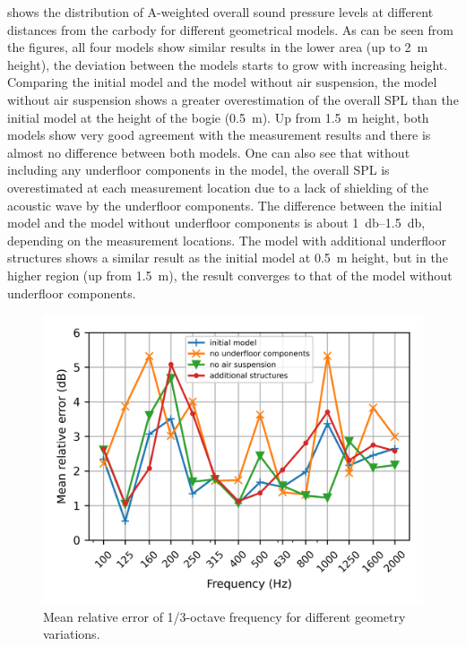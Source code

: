 shows the distribution of  A-weighted overall sound pressure levels at different distances from the carbody for different geometrical models.
As can be seen from the figures, all four models show similar results in the lower area (up to \SI{2}{\meter} height), the deviation between the models starts to grow with increasing height. Comparing the initial model and the model without air suspension, the model without air suspension shows a greater overestimation of the overall SPL than the initial model at the height of the bogie (\SI{0.5}{\meter}). Up from \SI{1.5}{\meter} height, both models show very good agreement with the measurement results and there is almost no difference between both models. One can also see that without including any underfloor components in the model, the overall SPL is overestimated at each measurement location due to a lack of shielding of the acoustic wave by the underfloor components. The difference between the initial model and the model without underfloor components is about \SIrange{1}{1.5}{\decibel}, depending on the measurement locations. The model with additional underfloor structures shows a similar result as the initial model at \SI{0.5}{\meter} height, but in the higher region (up from \SI{1.5}{\meter}), the result converges to that of the model without underfloor components.

\begin{figure}
	\centering
	\includegraphics[width=0.7\linewidth]{fig/chap5/geometry_variation/freq_spectrum/average_gap.png}
	\caption{Mean relative error of 1/3-octave frequency for different geometry variations.}
	\label{fig:gap_freq_spectrum_geometry}
\end{figure}

